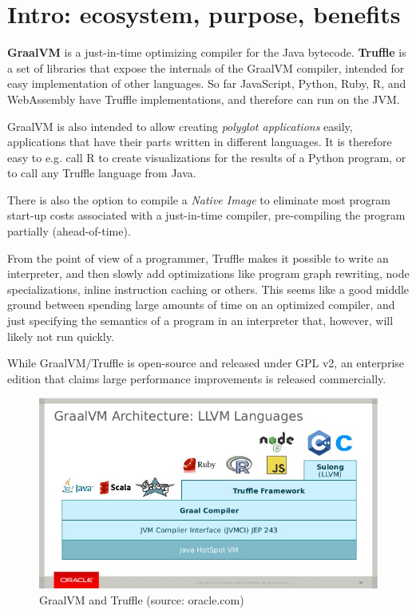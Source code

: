 \documentclass[english,zadani,odsaz]{fitthesis}
\begin{document}
\section{Intro: ecosystem, purpose, benefits}
\label{sec:orgb9a70cc}
\textbf{GraalVM} is a just-in-time optimizing compiler for the Java bytecode. \textbf{Truffle} is
a set of libraries that expose the internals of the GraalVM compiler, intended
for easy implementation of other languages. So far JavaScript, Python, Ruby, R,
and WebAssembly have Truffle implementations, and therefore can run on the JVM.

GraalVM is also intended to allow creating \emph{polyglot applications} easily,
applications that have their parts written in different languages. It is
therefore easy to e.g. call R to create visualizations for the results of a
Python program, or to call any Truffle language from Java.

There is also the option to compile a \emph{Native Image} to eliminate most program
start-up costs associated with a just-in-time compiler, pre-compiling the
program partially (ahead-of-time).

From the point of view of a programmer, Truffle makes it possible to write an
interpreter, and then slowly add optimizations like program graph rewriting,
node specializations, inline instruction caching or others. This seems like a
good middle ground between spending large amounts of time on an optimized
compiler, and just specifying the semantics of a program in an interpreter that,
however, will likely not run quickly.

While GraalVM/Truffle is open-source and released under GPL v2, an
enterprise edition that claims large performance improvements is released
commercially.

\begin{figure}[!htb]
\centering
\includegraphics[width=.9\linewidth]{./img/graalvm.jpg}
\caption{GraalVM and Truffle (source: oracle.com)}
\end{figure}
\end{document}
